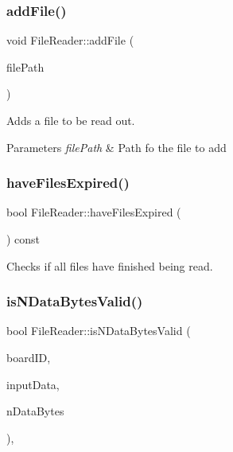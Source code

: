 \subsubsection{\texorpdfstring{add\+File()}{addFile()}}
{\footnotesize\ttfamily void File\+Reader\+::add\+File (\begin{DoxyParamCaption}\item[{const std\+::string \&}]{file\+Path }\end{DoxyParamCaption})\hspace{0.3cm}{\ttfamily [private]}}



Adds a file to be read out. 


\begin{DoxyParams}{Parameters}
{\em file\+Path} & Path fo the file to add \\
\hline
\end{DoxyParams}
\mbox{\label{class_file_reader_a58b80f2c9c2ec8381527bdfca1008007}} 
\subsubsection{\texorpdfstring{have\+Files\+Expired()}{haveFilesExpired()}}
{\footnotesize\ttfamily bool File\+Reader\+::have\+Files\+Expired (\begin{DoxyParamCaption}{ }\end{DoxyParamCaption}) const\hspace{0.3cm}{\ttfamily [inline]}}



Checks if all files have finished being read. 

\mbox{\label{class_file_reader_ae0a796cb06ebe3e486795dea8da0f6bc}} 
\subsubsection{\texorpdfstring{is\+N\+Data\+Bytes\+Valid()}{isNDataBytesValid()}}
{\footnotesize\ttfamily bool File\+Reader\+::is\+N\+Data\+Bytes\+Valid (\begin{DoxyParamCaption}\item[{const \hyperlink{class_board_identifier}{Board\+Identifier} \&}]{board\+ID,  }\item[{std\+::unique\+\_\+ptr$<$ std\+::ifstream $>$ \&}]{input\+Data,  }\item[{const unsigned int}]{n\+Data\+Bytes }\end{DoxyParamCaption})\hspace{0.3cm}{\ttfamily [inline]}, {\ttfamily [private]}}



